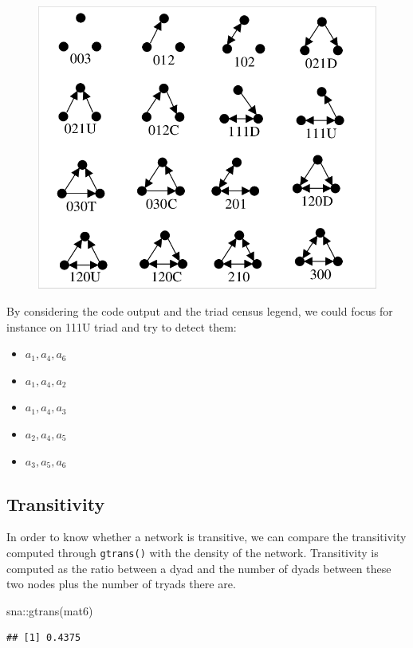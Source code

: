 \documentclass[
  notitlepage,
  onecolumn,
  openany]{book}
\newenvironment{Shaded}{\begin{snugshade}}{\end{snugshade}}
\newcommand{\FunctionTok}[1]{\textcolor[rgb]{0.00,0.00,0.00}{#1}}
\newcommand{\NormalTok}[1]{#1}
\newcommand{\SpecialCharTok}[1]{\textcolor[rgb]{0.00,0.00,0.00}{#1}}
\providecommand{\tightlist}{%
  \setlength{\itemsep}{0pt}\setlength{\parskip}{0pt}}
\begin{document}
\begin{figure}[h!]

{\centering \includegraphics[width=0.5\linewidth]{images/12-Reciprocity and transitivity/Untitled 3} 

}

\end{figure}

By considering the code output and the triad census legend, we could focus for instance on 111U triad and try to detect them:

\begin{itemize}
\tightlist
\item
  \(a_1, a_4, a_6\)
\item
  \(a_1, a_4, a_2\)
\item
  \(a_1, a_4, a_3\)
\item
  \(a_2, a_4, a_5\)
\item
  \(a_3, a_5, a_6\)
\end{itemize}

\hypertarget{transitivity}{%
\subsection{Transitivity}\label{transitivity}}

In order to know whether a network is transitive, we can compare the transitivity computed through \texttt{gtrans()} with the density of the network. Transitivity is computed as the ratio between a dyad and the number of dyads between these two nodes plus the number of tryads there are.

\begin{Shaded}
\begin{Highlighting}[]
\NormalTok{sna}\SpecialCharTok{::}\FunctionTok{gtrans}\NormalTok{(mat6)}
\end{Highlighting}
\end{Shaded}

\begin{verbatim}
## [1] 0.4375
\end{verbatim}
\end{document}
